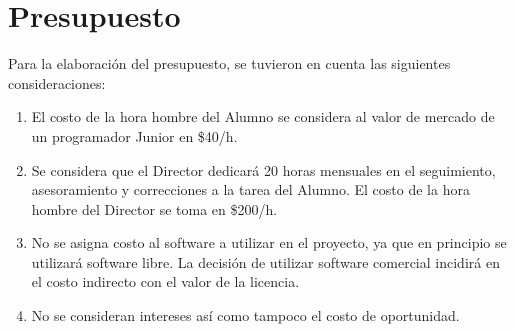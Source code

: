 \documentclass[12pt,bibliography=oldstyle,DIV=14,parskip=full-,titlepage]{scrartcl}
\begin{document}
\section{Presupuesto}
Para la elaboración del presupuesto, se tuvieron en cuenta las
siguientes consideraciones:
\begin{enumerate}
\item El costo de la hora hombre del Alumno se considera al valor de
  mercado de un programador Junior en \$40/h.
\item Se considera que el Director dedicará 20 horas mensuales en el
  seguimiento, asesoramiento y correcciones a la tarea del Alumno. El
  costo de la hora hombre del Director se toma en \$200/h.
\item No se asigna costo al software a utilizar en el proyecto, ya que
  en principio se utilizará software libre. La decisión de utilizar
  software comercial incidirá en el costo indirecto con el valor de la
  licencia.
\item No se consideran intereses así como tampoco el costo de
  oportunidad.
\end{enumerate}
\end{document}
